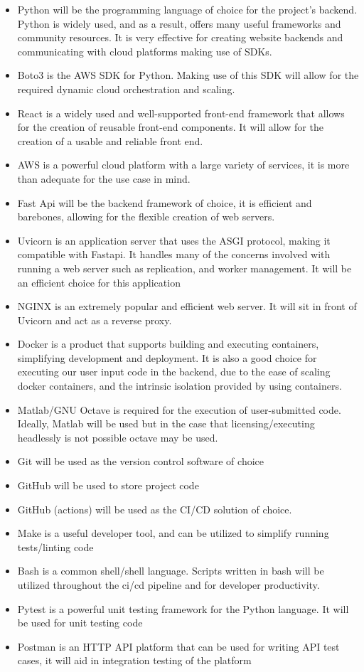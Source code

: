 \documentclass{article}
\begin{document}
\begin{itemize}
    \item Python will be the programming language of choice for the project's backend. Python is widely used, and as a result, offers many useful frameworks and community resources. It is very effective for creating website backends and communicating with cloud platforms making use of SDKs.
    \item Boto3 is the AWS SDK for Python. Making use of this SDK will allow for the required dynamic cloud orchestration and scaling.
    \item React is a widely used and well-supported front-end framework that allows for the creation of reusable front-end components. It will allow for the creation of a usable and reliable front end.
    \item AWS is a powerful cloud platform with a large variety of services, it is more than adequate for the use case in mind.
    \item Fast Api will be the backend framework of choice, it is efficient and barebones, allowing for the flexible creation of web servers.
    \item Uvicorn is an application server that uses the ASGI protocol, making it compatible with Fastapi. It handles many of the concerns involved with running a web server such as replication, and worker management. It will be an efficient choice for this application
    \item NGINX is an extremely popular and efficient web server. It will sit in front of Uvicorn and act as a reverse proxy.
    \item Docker is a product that supports building and executing containers, simplifying development and deployment. It is also a good choice for executing our user input code in the backend, due to the ease of scaling docker containers, and the intrinsic isolation provided by using containers.
    \item Matlab/GNU Octave is required for the execution of user-submitted code. Ideally, Matlab will be used but in the case that licensing/executing headlessly is not possible octave may be used.
    \item Git will be used as the version control software of choice
    \item GitHub will be used to store project code
    \item GitHub (actions) will be used as the CI/CD solution of choice.
    \item Make is a useful developer tool, and can be utilized to simplify running tests/linting code
    \item Bash is a common shell/shell language. Scripts written in bash will be utilized throughout the ci/cd pipeline and for developer productivity.
    \item Pytest is a powerful unit testing framework for the Python language. It will be used for unit testing code
    \item Postman is an HTTP API platform that can be used for writing API test cases, it will aid in integration testing of the platform
\end{itemize}
\end{document}
